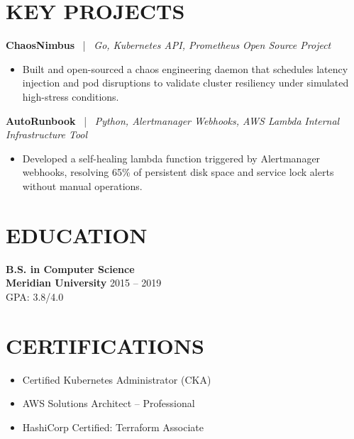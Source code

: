 \documentclass[10pt,a4paper]{article}
\newcommand{\projectEntry}[3]{
  \noindent
  {\textbf{#1}} \ | \ {\color{accent}\textit{#2}} \hfill {\small\textit{#3}}
  \par\vspace{1pt}
}
\begin{document}
\section*{KEY PROJECTS}

\projectEntry{ChaosNimbus}{Go, Kubernetes API, Prometheus}{Open Source Project}
\begin{itemize}
  \item Built and open-sourced a chaos engineering daemon that schedules latency injection and pod disruptions to validate cluster resiliency under simulated high-stress conditions.
\end{itemize}
\vspace{4pt}

\projectEntry{AutoRunbook}{Python, Alertmanager Webhooks, AWS Lambda}{Internal Infrastructure Tool}
\begin{itemize}
  \item Developed a self-healing lambda function triggered by Alertmanager webhooks, resolving 65\% of persistent disk space and service lock alerts without manual operations.
\end{itemize}
\vspace{4pt}

\noindent
\begin{minipage}[t]{0.48\textwidth}
  \section*{EDUCATION}
  \noindent
  \textbf{B.S. in Computer Science} \\
  {\color{accent}\textbf{Meridian University}} \hfill {\small 2015 -- 2019} \\
  GPA: 3.8/4.0
\end{minipage}
\hfill
\begin{minipage}[t]{0.48\textwidth}
  \section*{CERTIFICATIONS}
  \begin{itemize}[leftmargin=1.2em]
    \item Certified Kubernetes Administrator (CKA)
    \item AWS Solutions Architect -- Professional
    \item HashiCorp Certified: Terraform Associate
  \end{itemize}
\end{minipage}
\end{document}
